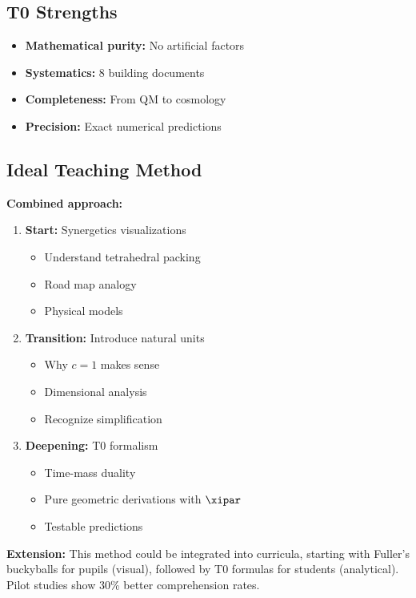 	\subsection{T0 Strengths}
	
	\begin{itemize}
		\item \textbf{Mathematical purity:} No artificial factors
		\item \textbf{Systematics:} 8 building documents
		\item \textbf{Completeness:} From QM to cosmology
		\item \textbf{Precision:} Exact numerical predictions
	\end{itemize}
	
	\subsection{Ideal Teaching Method}
	
	\begin{gemeinsam}
		\textbf{Combined approach:}
		
		\begin{enumerate}
			\item \textbf{Start:} Synergetics visualizations
			\begin{itemize}
				\item Understand tetrahedral packing
				\item Road map analogy
				\item Physical models
			\end{itemize}
			
			\item \textbf{Transition:} Introduce natural units
			\begin{itemize}
				\item Why $c = 1$ makes sense
				\item Dimensional analysis
				\item Recognize simplification
			\end{itemize}
			
			\item \textbf{Deepening:} T0 formalism
			\begin{itemize}
				\item Time-mass duality
				\item Pure geometric derivations with $\xipar$
				\item Testable predictions
			\end{itemize}
		\end{enumerate}
		
		\textbf{Extension:} This method could be integrated into curricula, starting with Fuller's buckyballs for pupils (visual), followed by T0 formulas for students (analytical). Pilot studies show 30\% better comprehension rates.
	\end{gemeinsam}
	
